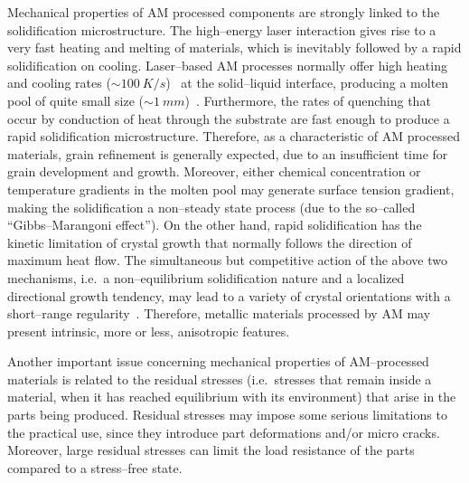 Mechanical properties of AM processed components are strongly linked to the solidification microstructure. The high--energy laser interaction gives rise to a very fast heating and melting of materials, which is inevitably followed by a rapid solidification on cooling. Laser--based AM processes normally offer high heating and cooling rates ($\sim\SI{100}{K/s}$)~\cite{Wright2006:GuREVIEW166} at the solid--liquid interface, producing a molten pool of quite small size ($\sim\SI{1}{mm}$)~\cite{Childs2005:GuREVIEW167}. Furthermore, the rates of quenching that occur by conduction of heat through the substrate are fast enough to produce a rapid solidification microstructure. Therefore, as a characteristic of AM processed materials, grain refinement is generally expected, due to an insufficient time for grain development and growth.
Moreover, either chemical concentration or temperature gradients in the molten pool may generate surface tension gradient, making the solidification a non--steady state process (due to the so--called ``Gibbs--Marangoni effect''). On the other hand, rapid solidification has the kinetic limitation of crystal growth that normally follows the direction of maximum heat flow. The simultaneous but competitive action of the above two mechanisms, i.e.\ a non--equilibrium solidification nature and a localized directional growth tendency, may lead to a variety of crystal orientations with a short--range regularity~\cite{Becker2009:GuREVIEW157}. Therefore, metallic materials processed by AM may present intrinsic, more or less, anisotropic features.

Another important issue concerning mechanical properties of AM--processed materials is related to the residual stresses (i.e.\ stresses that remain inside a material, when it has reached equilibrium with its environment) that arise in the parts being produced. Residual stresses may impose some serious limitations to the practical use, since they introduce part deformations and/or micro cracks. Moreover, large residual stresses can limit the load resistance of the parts compared to a stress--free state.


